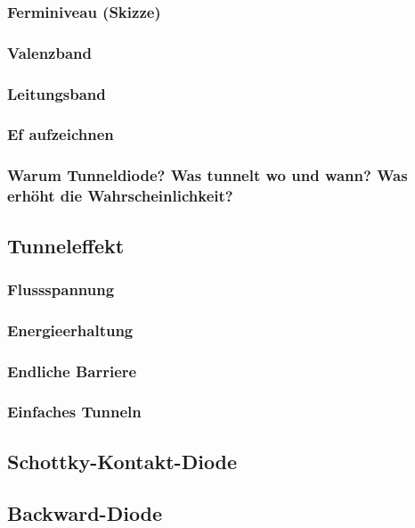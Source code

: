 \documentclass{article}
\begin{document}
    \subsubsection{Ferminiveau (Skizze)}
    \subsubsection{Valenzband}
    \subsubsection{Leitungsband}
    \subsubsection{Ef aufzeichnen}

    \subsubsection{Warum Tunneldiode? Was tunnelt wo und wann? Was erhöht die Wahrscheinlichkeit?}

\subsection{Tunneleffekt}\label{k5:tunnelEffekt}
    \subsubsection{Flussspannung}
    \subsubsection{Energieerhaltung}
    \subsubsection{Endliche Barriere}
    \subsubsection{Einfaches Tunneln}

\subsection{Schottky-Kontakt-Diode}\label{k5:schottky}

\subsection{Backward-Diode}\label{k5:backward}
\end{document}
